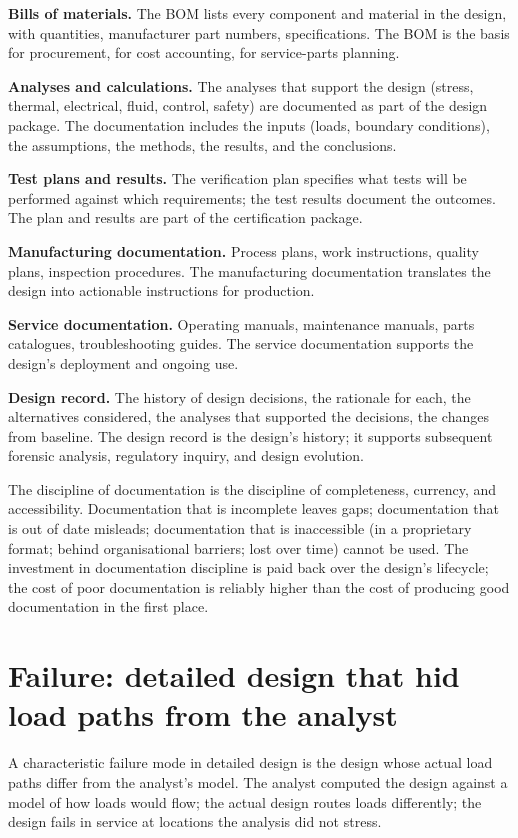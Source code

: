\textbf{Bills of materials.} The BOM lists every component and material in the design, with quantities, manufacturer part numbers, specifications. The BOM is the basis for procurement, for cost accounting, for service-parts planning.

\textbf{Analyses and calculations.} The analyses that support the design (stress, thermal, electrical, fluid, control, safety) are documented as part of the design package. The documentation includes the inputs (loads, boundary conditions), the assumptions, the methods, the results, and the conclusions.

\textbf{Test plans and results.} The verification plan specifies what tests will be performed against which requirements; the test results document the outcomes. The plan and results are part of the certification package.

\textbf{Manufacturing documentation.} Process plans, work instructions, quality plans, inspection procedures. The manufacturing documentation translates the design into actionable instructions for production.

\textbf{Service documentation.} Operating manuals, maintenance manuals, parts catalogues, troubleshooting guides. The service documentation supports the design's deployment and ongoing use.

\textbf{Design record.} The history of design decisions, the rationale for each, the alternatives considered, the analyses that supported the decisions, the changes from baseline. The design record is the design's history; it supports subsequent forensic analysis, regulatory inquiry, and design evolution.

The discipline of documentation is the discipline of completeness, currency, and accessibility. Documentation that is incomplete leaves gaps; documentation that is out of date misleads; documentation that is inaccessible (in a proprietary format; behind organisational barriers; lost over time) cannot be used. The investment in documentation discipline is paid back over the design's lifecycle; the cost of poor documentation is reliably higher than the cost of producing good documentation in the first place.

\section{Failure: detailed design that hid load paths from the analyst}

A characteristic failure mode in detailed design is the design whose actual load paths differ from the analyst's model. The analyst computed the design against a model of how loads would flow; the actual design routes loads differently; the design fails in service at locations the analysis did not stress.


